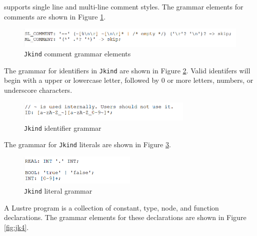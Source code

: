 \jkind supports single line and multi-line comment styles. The grammar elements for comments are shown in Figure \ref{fig:jk1}.

 \begin{figure}
 \centering
  \includegraphics[width=\textwidth]{figs/jk1.png}
  \caption{\texttt{Jkind} comment grammar elements}
  \vspace{0.1in}
  \label{fig:jk1}
\end{figure}

The grammar for identifiers in \texttt{Jkind} are shown in Figure \ref{fig:jk2}. Valid identifers will begin with a upper or lowercase letter, followed by 0 or more letters, numbers, or underscore characters.

 \begin{figure}
 \centering
  \includegraphics[width=0.75\textwidth]{figs/jk2.png}
  \caption{\texttt{Jkind} identifier grammar}
  \vspace{0.1in}
  \label{fig:jk2}
\end{figure}

The grammar for \texttt{Jkind} literals are shown in Figure \ref{fig:jk3}.

 \begin{figure}
 \centering
  \includegraphics[width=0.5\textwidth]{figs/jk3.png}
  \caption{\texttt{Jkind} literal grammar}
  \vspace{0.1in}
  \label{fig:jk3}
\end{figure}

A Lustre program is a collection of constant, type, node, and function declarations. The grammar elements for these declarations are shown in Figure \ref{fig:jk4}.

